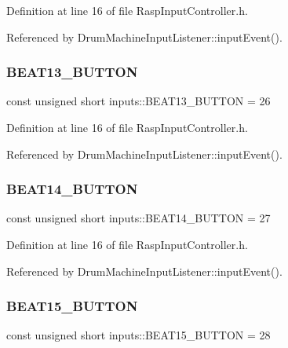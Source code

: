 Definition at line 16 of file Rasp\+Input\+Controller.\+h.



Referenced by Drum\+Machine\+Input\+Listener\+::input\+Event().

\mbox{\label{namespaceinputs_a8f9d547eaa8c52cebfa64221341f266a}} 
\subsubsection{\texorpdfstring{B\+E\+A\+T13\+\_\+\+B\+U\+T\+T\+ON}{BEAT13\_BUTTON}}
{\footnotesize\ttfamily const unsigned short inputs\+::\+B\+E\+A\+T13\+\_\+\+B\+U\+T\+T\+ON = 26}



Definition at line 16 of file Rasp\+Input\+Controller.\+h.



Referenced by Drum\+Machine\+Input\+Listener\+::input\+Event().

\mbox{\label{namespaceinputs_a4dfd34a5656f72c71f1b2dd8efc963dc}} 
\subsubsection{\texorpdfstring{B\+E\+A\+T14\+\_\+\+B\+U\+T\+T\+ON}{BEAT14\_BUTTON}}
{\footnotesize\ttfamily const unsigned short inputs\+::\+B\+E\+A\+T14\+\_\+\+B\+U\+T\+T\+ON = 27}



Definition at line 16 of file Rasp\+Input\+Controller.\+h.



Referenced by Drum\+Machine\+Input\+Listener\+::input\+Event().

\mbox{\label{namespaceinputs_a1952aa2d27b65c8d8899a1ae1cfb7bb9}} 
\subsubsection{\texorpdfstring{B\+E\+A\+T15\+\_\+\+B\+U\+T\+T\+ON}{BEAT15\_BUTTON}}
{\footnotesize\ttfamily const unsigned short inputs\+::\+B\+E\+A\+T15\+\_\+\+B\+U\+T\+T\+ON = 28}



